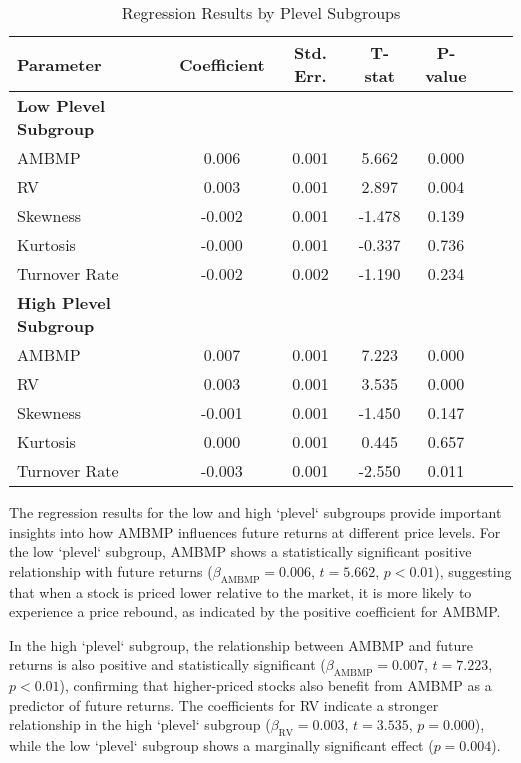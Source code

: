 \documentclass[preprint,12pt,authoryear]{elsarticle}
\begin{document}
\begin{table}[h!]
  \centering
  \caption{Regression Results by Plevel Subgroups}
  \label{tab:plevel_subgroup_results}
  \begin{tabular}{lcccccc}
    \toprule
    \textbf{Parameter}     & \textbf{Coefficient} & \textbf{Std. Err.} & \textbf{T-stat} & \textbf{P-value} \\
    \midrule
    \textbf{Low Plevel Subgroup} &          &          &          &          \\
    AMBMP                  & 0.006   & 0.001   & 5.662   & 0.000   \\
    RV                     & 0.003   & 0.001   & 2.897   & 0.004   \\
    Skewness               & -0.002  & 0.001   & -1.478  & 0.139   \\
    Kurtosis               & -0.000  & 0.001   & -0.337  & 0.736   \\
    Turnover Rate          & -0.002  & 0.002   & -1.190  & 0.234   \\
    \midrule
    \textbf{High Plevel Subgroup} &          &          &          &          \\
    AMBMP                  & 0.007   & 0.001   & 7.223   & 0.000   \\
    RV                     & 0.003   & 0.001   & 3.535   & 0.000   \\
    Skewness               & -0.001  & 0.001   & -1.450  & 0.147   \\
    Kurtosis               & 0.000   & 0.001   & 0.445   & 0.657   \\
    Turnover Rate          & -0.003  & 0.001   & -2.550  & 0.011   \\
    \bottomrule
  \end{tabular}
\end{table}

The regression results for the low and high `plevel` subgroups provide important insights into how AMBMP influences future returns at different price levels. For the low `plevel` subgroup, AMBMP shows a statistically significant positive relationship with future returns (\(\beta_{\mathrm{AMBMP}} = 0.006\), \(t = 5.662\), \(p < 0.01\)), suggesting that when a stock is priced lower relative to the market, it is more likely to experience a price rebound, as indicated by the positive coefficient for AMBMP.

In the high `plevel` subgroup, the relationship between AMBMP and future returns is also positive and statistically significant (\(\beta_{\mathrm{AMBMP}} = 0.007\), \(t = 7.223\), \(p < 0.01\)), confirming that higher-priced stocks also benefit from AMBMP as a predictor of future returns. The coefficients for RV indicate a stronger relationship in the high `plevel` subgroup (\(\beta_{\mathrm{RV}} = 0.003\), \(t = 3.535\), \(p = 0.000\)), while the low `plevel` subgroup shows a marginally significant effect (\(p = 0.004\)).
\end{document}
